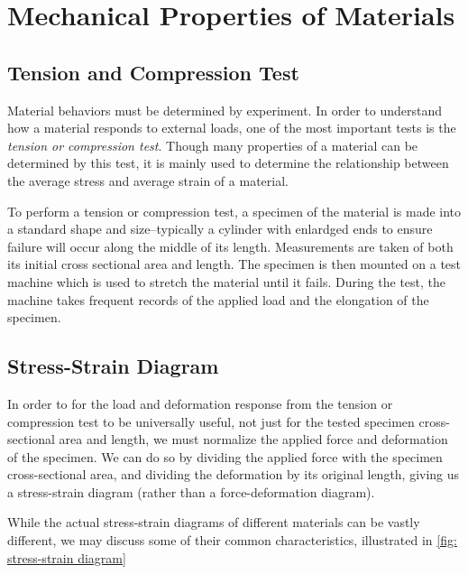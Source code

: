 \documentclass[
10pt,
a4paper,
openany,
svgnames,
]{book} %
\begin{document}
\section{Mechanical Properties of Materials}

\subsection{Tension and Compression Test}

Material behaviors must be determined by experiment. In order to understand how a material responds to external loads, one of the most important tests is the \emph{tension or compression test}. Though many properties of a material can be determined by this test, it is mainly used to determine the relationship between the average stress and average strain of a material.

To perform a tension or compression test, a specimen of the material is made into a standard shape and size--typically a cylinder with enlardged ends to ensure failure will occur along the middle of its length. Measurements are taken of both its initial cross sectional area and length. The specimen is then mounted on a test machine which is used to stretch the material until it fails. During the test, the machine takes frequent records of the applied load and the elongation of the specimen.

\subsection{Stress-Strain Diagram}

In order to for the load and deformation response from the tension or compression test to be universally useful, not just for the tested specimen cross-sectional area and length, we must normalize the applied force and deformation of the specimen. We can do so by dividing the applied force with the specimen cross-sectional area, and dividing the deformation by its original length, giving us a stress-strain diagram (rather than a force-deformation diagram).

While the actual stress-strain diagrams of different materials can be vastly different, we may discuss some of their common characteristics, illustrated in \cref{fig: stress-strain diagram}
\end{document}
